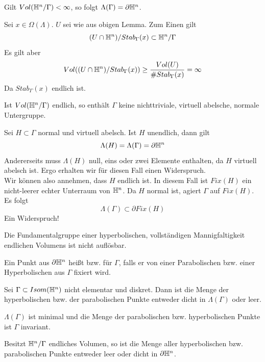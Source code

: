 \documentclass{book}
\begin{document}
\Prop{}
Gilt $Vol(\mathbb{H}^n / \Gamma) < \infty$, so folgt $\Lambda(\Gamma) = \partial\mathbb{H}^n$.
\begin{Beweis}{}
	Sei $x \in \Omega(\Lambda)$. $U$ sei wie aus obigen Lemma. Zum Einen gilt
	\[ (U\cap \mathbb{H}^n) / Stab_\Gamma(x) \subset \mathbb{H}^n / \Gamma \]
	Es gilt aber
	\[ Vol((U\cap \mathbb{H}^n) / Stab_\Gamma(x)) \geq  \frac{Vol(U)}{\# Stab_\Gamma(x)} = \infty \]
	Da $Stab_\Gamma(x)$ endlich ist.
\end{Beweis}

\Kor{}
Ist $Vol(\mathbb{H}^n / \Gamma)$ endlich, so enthält $\Gamma$ keine nichttriviale, virtuell abelsche, normale Untergruppe.
\begin{Beweis}{}
	Sei $H \subset \Gamma$ normal und virtuell abelsch. Ist $H$ unendlich, dann gilt
	\[ \Lambda(H) = \Lambda(\Gamma)= \partial \mathbb{H}^n \]
	Andererseits muss $\Lambda(H)$ null, eins oder zwei Elemente enthalten, da $H$ virtuell abelsch ist. Ergo erhalten wir für diesen Fall einen Widerspruch.\\
	Wir können also annehmen, dass $H$ endlich ist. In diesem Fall ist $Fix(H)$ ein nicht-leerer echter Unterraum von $\mathbb{H}^n$. Da $H$ normal ist, agiert $\Gamma$ auf $Fix(H)$. Es folgt
	\[ \Lambda(\Gamma) \subset \partial Fix(H) \]
	Ein Widerspruch!
\end{Beweis}

\Kor{}
Die Fundamentalgruppe einer hyperbolischen, vollständigen Mannigfaltigkeit endlichen Volumens ist nicht auflösbar.

\Def{}
Ein Punkt aus $\partial \mathbb{H}^n$ heißt  bzw.  für $\Gamma$, falls er von einer Parabolischen bzw. einer Hyperbolischen aus $\Gamma$ fixiert wird.

\Prop{}
Sei $\Gamma \subset Isom(\mathbb{H}^n)$ nicht elementar und diskret. Dann ist die Menge der hyperbolischen bzw. der parabolischen Punkte entweder dicht in $\Lambda(\Gamma)$ oder leer.
\begin{Beweis}{}
	$\Lambda(\Gamma)$ ist minimal und die Menge der parabolischen bzw. hyperbolischen Punkte ist $\Gamma$ invariant.
\end{Beweis}

\Kor{}
Besitzt $\mathbb{H}^n / \Gamma$ endliches Volumen, so ist die Menge aller hyperbolischen bzw. parabolischen Punkte entweder leer oder dicht in $\partial \mathbb{H}^n$.
\end{document}

